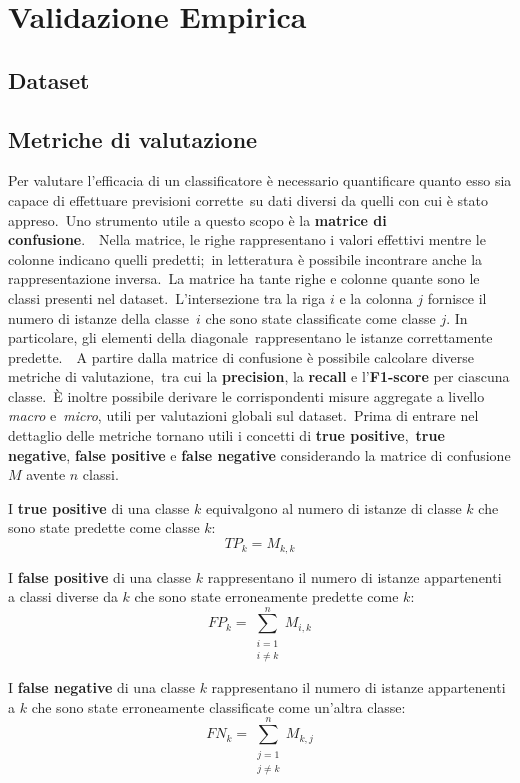 \chapter{Validazione Empirica}

\section{Dataset}

\section{Metriche di valutazione}

Per valutare l'efficacia di un classificatore è necessario quantificare quanto esso sia capace di effettuare previsioni corrette\
su dati diversi da quelli con cui è stato appreso.\
Uno strumento utile a questo scopo è la \textbf{matrice di confusione}.\
\
Nella matrice, le righe rappresentano i valori effettivi mentre le colonne indicano quelli predetti;\
in letteratura è possibile incontrare anche la rappresentazione inversa.\
La matrice ha tante righe e colonne quante sono le classi presenti nel dataset.\
L'intersezione tra la riga $i$ e la colonna $j$ fornisce il numero di istanze della classe\
$i$ che sono state classificate come classe $j$. In particolare, gli elementi della diagonale\
rappresentano le istanze correttamente predette.\
\
A partire dalla matrice di confusione è possibile calcolare diverse metriche di valutazione,\
tra cui la \textbf{precision}, la \textbf{recall} e l'\textbf{F1-score} per ciascuna classe.\
È inoltre possibile derivare le corrispondenti misure aggregate a livello \textit{macro} e\
\textit{micro}, utili per valutazioni globali sul dataset.\
Prima di entrare nel dettaglio delle metriche tornano utili i concetti di \textbf{true positive},\
\textbf{true negative}, \textbf{false positive} e \textbf{false negative} considerando la matrice di confusione $M$ avente $n$ classi.

I \textbf{true positive} di una classe $k$ equivalgono al numero di istanze di classe $k$ che
sono state predette come classe $k$:
\[
    TP_{k} = M_{k,k}
\]

I \textbf{false positive} di una classe $k$ rappresentano il numero di istanze appartenenti a
classi diverse da $k$ che sono state erroneamente predette come $k$:
\[
    FP_{k} = \sum_{\substack{i=1 \\ i \neq k}}^{n} M_{i,k}
\]

I \textbf{false negative} di una classe $k$ rappresentano il numero di istanze appartenenti a
$k$ che sono state erroneamente classificate come un'altra classe:
\[
    FN_{k} = \sum_{\substack{j=1 \\ j \neq k}}^{n} M_{k,j}
\]

